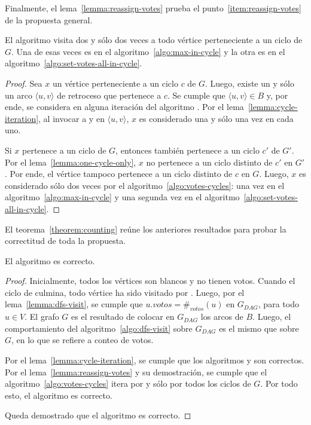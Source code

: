 Finalmente, el lema~\ref{lemma:reassign-votes} prueba el punto~\ref{item:reassign-votes} de la propuesta general.

\begin{lemma}\label{lemma:reassign-votes}
    El algoritmo \cyclevotescaption \;visita dos y s\'olo dos veces a todo v\'ertice perteneciente a un ciclo de $G$. Una de esas veces es en el algoritmo~\ref{algo:max-in-cycle} y la otra es en el algoritmo~\ref{algo:set-votes-all-in-cycle}.
\end{lemma}

\begin{proof}
    Sea $x$ un v\'ertice perteneciente a un ciclo $c$ de $G$. Luego, existe un y s\'olo un arco $\langle u, v \rangle$ de retroceso que pertenece a $c$. Se cumple que $\langle u, v \rangle \in B$ y, por ende, se considera en alguna iteraci\'on del algoritmo \cyclevotescaption. Por el lema~\ref{lemma:cycle-iteration}, al invocar a \maxincyclecaption \;y \setvotestoallincyclecaption \;en $\langle u, v \rangle$, $x$ es considerado una y s\'olo una vez en cada uno. 

    Si $x$ pertenece a un ciclo de $G$, entonces tambi\'en pertenece a un ciclo  $c'$ de $G'$. Por el lema~\ref{lemma:one-cycle-only}, $x$ no pertenece a un ciclo distinto de $c'$ en $G'$. Por ende, el v\'ertice tampoco pertenece a un ciclo distinto de $c$ en $G$. Luego, $x$ es considerado s\'olo dos veces por el algoritmo~\ref{algo:votes-cycles}: una vez en el algoritmo~\ref{algo:max-in-cycle} y una segunda vez en el algoritmo~\ref{algo:set-votes-all-in-cycle}.
\end{proof}

El teorema~\ref{theorem:counting} re\'une los anteriores resultados para probar la correctitud de toda la propuesta.

\begin{theorem}\label{theorem:counting}
    El algoritmo \dfscaption \;es correcto.
\end{theorem}

\begin{proof}
    Inicialmente, todos los v\'ertices son blancos y no tienen votos. Cuando el ciclo de \dfscaption \;culmina, todo v\'ertice ha sido visitado por \dfsvisitcaption. Luego, por el lema~\ref{lemma:dfs-visit}, se cumple que $u.votos = \#_{votos}(u)$ en $G_{DAG}$, para todo $u \in V$. El grafo $G$ es el resultado de colocar en $G_{DAG}$ los arcos de $B$. Luego, el comportamiento del algoritmo~\ref{algo:dfs-visit} sobre $G_{DAG}$ es el mismo que sobre $G$, en lo que se refiere a conteo de votos. 

    Por el lema~\ref{lemma:cycle-iteration}, se cumple que los algoritmos \maxincyclecaption \;y \setvotestoallincyclecaption \;son correctos.  Por el lema~\ref{lemma:reassign-votes} y su demostraci\'on, se cumple que el algoritmo~\ref{algo:votes-cycles} itera por y s\'olo por todos los ciclos de $G$. Por todo esto, el algoritmo \cyclevotescaption \;es correcto.

    Queda demostrado que el algoritmo \dfscaption \;es correcto.
\end{proof}


